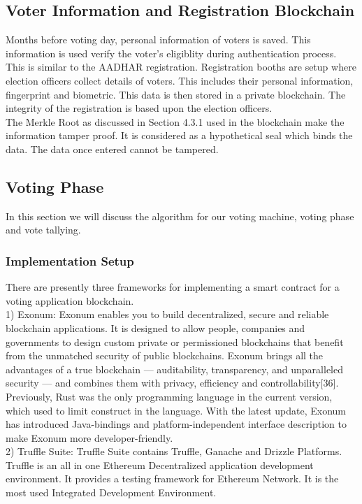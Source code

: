 \documentclass{report}
\begin{document}
\subsection{Voter Information and Registration Blockchain}
Months before voting day, personal information of voters is saved. This information is used verify the voter's eligiblity during authentication process. This is similar to the AADHAR\cite{WinNT30} registration. Registration booths are setup where election officers collect details of voters. This includes their personal information, fingerprint and biometric. This data is then stored in a private blockchain. The integrity of the registration is based upon the election officers.\\
The Merkle Root as discussed in Section 4.3.1  used in the blockchain make the information tamper proof. It is considered as a hypothetical seal which binds the data. The data once entered cannot be tampered.
\subsection{Voting Phase}
In this section we will discuss the algorithm for our voting machine, voting phase and vote tallying.

\subsubsection{Implementation Setup}
There are presently three frameworks for implementing a smart contract for a voting application blockchain.\\
1) Exonum: Exonum\cite{WinNT33} enables you to build decentralized, secure and reliable blockchain applications. It is designed to allow people, companies and governments to design custom private or permissioned blockchains that benefit from the unmatched security of public blockchains. Exonum brings all the advantages of a true blockchain — auditability, transparency, and unparalleled security — and combines them with privacy, efficiency and controllability[36]. Previously, Rust was the only programming language in the current version, which used to limit construct in the language. With the latest update, Exonum has introduced Java-bindings and platform-independent interface description to make Exonum more developer-friendly.\\
2) Truffle Suite: Truffle Suite contains Truffle, Ganache and Drizzle Platforms. Truffle is an all in one Ethereum Decentralized application development environment. It provides a testing framework for Ethereum Network\cite{WinNT31}. It is the most used Integrated Development Environment.\\
\end{document}
